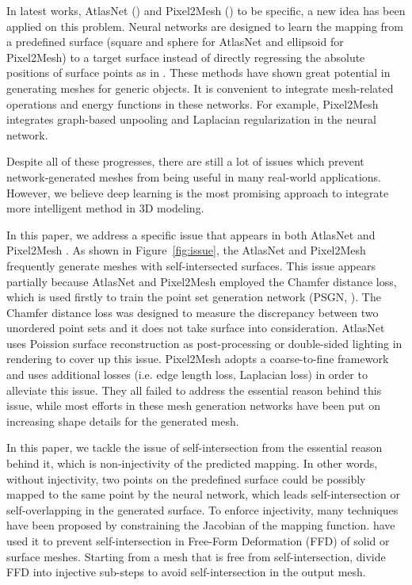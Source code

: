 In latest works, AtlasNet (\cite{atlasnet}) and Pixel2Mesh (\cite{pixel2mesh}) to be specific, a new idea has been applied on this problem. Neural networks are designed to learn the mapping from a predefined surface (square and sphere for AtlasNet and ellipsoid for Pixel2Mesh) to a target surface instead of directly regressing the absolute positions of surface points as in \cite{PSGN}. These methods have shown great potential in generating meshes for generic objects. It is convenient to integrate mesh-related operations and energy functions in these networks. For example, Pixel2Mesh integrates graph-based unpooling and Laplacian regularization in the neural network.

Despite all of these progresses, there are still a lot of issues which prevent network-generated meshes from being useful in many real-world applications. However, we believe deep learning is the most promising approach to integrate more intelligent method in 3D modeling.

 In this paper, we address a specific issue that appears in both AtlasNet \cite{atlasnet} and Pixel2Mesh \cite{pixel2mesh}. As shown in Figure~\ref{fig:issue}, the AtlasNet and Pixel2Mesh frequently generate meshes with self-intersected surfaces. This issue appears partially because AtlasNet and Pixel2Mesh employed the Chamfer distance loss, which is used firstly to train the point set generation network (PSGN, \cite{PSGN}). The Chamfer distance loss was designed to measure the discrepancy between two unordered point sets and it does not take surface into consideration. AtlasNet uses Poission surface reconstruction as post-processing or double-sided lighting in rendering to cover up this issue. Pixel2Mesh adopts a coarse-to-fine framework and uses additional losses (i.e. edge length loss, Laplacian loss) in order to alleviate this issue. They all failed to address the essential reason behind this issue, while most efforts in these mesh generation networks have been put on increasing shape details for the generated mesh.

In this paper, we tackle the issue of self-intersection from the essential reason behind it, which is non-injectivity of the predicted mapping. In other words, without injectivity, two points on the predefined surface could be possibly mapped to the same point by the neural network, which leads self-intersection or self-overlapping in the generated surface.
To enforce  injectivity, many techniques have been proposed by constraining the Jacobian of the mapping function. \cite{tvcgprevent} have used it to prevent self-intersection in Free-Form Deformation (FFD) of solid or surface meshes. Starting from a mesh that is free from self-intersection, \cite{tvcgprevent} divide FFD into injective sub-steps to avoid self-intersection in the output mesh.

